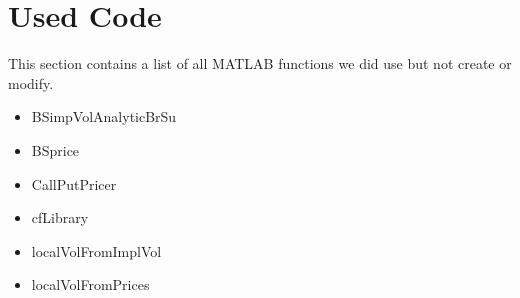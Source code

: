\section{Used Code}
This section contains a list of all MATLAB functions we did use but not create or modify.
\begin{itemize}
\item BSimpVolAnalyticBrSu 
\item BSprice
\item CallPutPricer
\item cfLibrary
\item localVolFromImplVol
\item localVolFromPrices
\end{itemize}